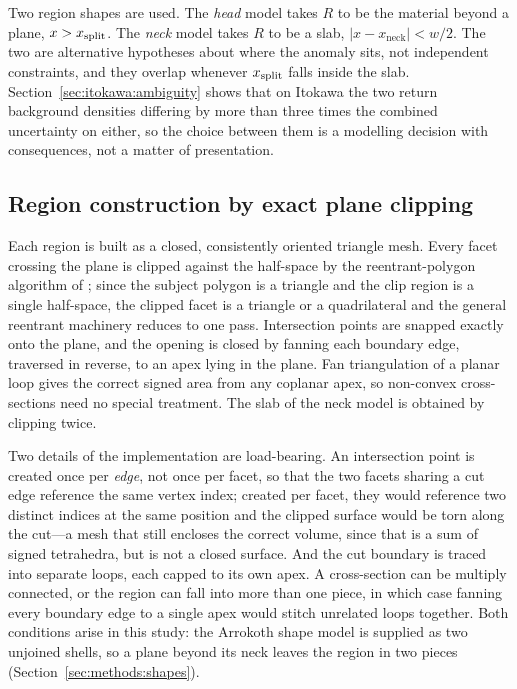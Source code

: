 Two region shapes are used. The \emph{head} model takes $R$ to be the
material beyond a plane, $x > x_{\mathrm{split}}$. The \emph{neck} model takes $R$
to be a slab, $\lvert x - x_{\mathrm{neck}}\rvert < w/2$. The two are
alternative hypotheses about where the anomaly sits, not independent
constraints, and they overlap whenever $x_{\mathrm{split}}$ falls inside the slab.
Section~\ref{sec:itokawa:ambiguity} shows that on Itokawa the two return
background densities differing by more than three times the combined
uncertainty on either, so the choice between them is a modelling decision
with consequences, not a matter of presentation.

\subsection{Region construction by exact plane clipping}
\label{sec:methods:clip}

Each region is built as a closed, consistently oriented triangle mesh.
Every facet crossing the plane is clipped against the half-space by the
reentrant-polygon algorithm of \citet{sutherland1974}; since the subject
polygon is a triangle and the clip region is a single half-space, the
clipped facet is a triangle or a quadrilateral and the general reentrant
machinery reduces to one pass. Intersection points are snapped exactly
onto the plane, and the opening is closed by fanning each boundary edge,
traversed in reverse, to an apex lying in the plane. Fan triangulation of
a planar loop gives the correct signed area from any coplanar apex, so
non-convex cross-sections need no special treatment. The slab of the neck
model is obtained by clipping twice.

Two details of the implementation are load-bearing. An intersection point
is created once per \emph{edge}, not once per facet, so that the two
facets sharing a cut edge reference the same vertex index; created per
facet, they would reference two distinct indices at the same position and
the clipped surface would be torn along the cut---a mesh that still
encloses the correct volume, since that is a sum of signed tetrahedra,
but is not a closed surface. And the cut boundary is traced into separate
loops, each capped to its own apex. A cross-section can be multiply
connected, or the region can fall into more than one piece, in which case
fanning every boundary edge to a single apex would stitch unrelated loops
together. Both conditions arise in this study: the Arrokoth shape model
is supplied as two unjoined shells, so a plane beyond its neck leaves the
region in two pieces (Section~\ref{sec:methods:shapes}).

